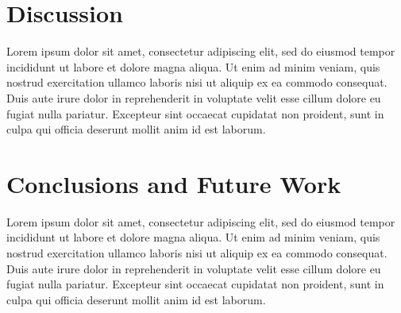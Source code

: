 \documentclass{acm_proc_article-sp}
\begin{document}
\section{Discussion}

Lorem ipsum dolor sit amet, consectetur adipiscing elit, sed do eiusmod tempor incididunt ut labore et dolore magna aliqua. Ut enim ad minim veniam, quis nostrud exercitation ullamco laboris nisi ut aliquip ex ea commodo consequat. Duis aute irure dolor in reprehenderit in voluptate velit esse cillum dolore eu fugiat nulla pariatur. Excepteur sint occaecat cupidatat non proident, sunt in culpa qui officia deserunt mollit anim id est laborum.



\section{Conclusions and Future Work}

Lorem ipsum dolor sit amet, consectetur adipiscing elit, sed do eiusmod tempor incididunt ut labore et dolore magna aliqua. Ut enim ad minim veniam, quis nostrud exercitation ullamco laboris nisi ut aliquip ex ea commodo consequat. Duis aute irure dolor in reprehenderit in voluptate velit esse cillum dolore eu fugiat nulla pariatur. Excepteur sint occaecat cupidatat non proident, sunt in culpa qui officia deserunt mollit anim id est laborum.


% 





\end{document}
